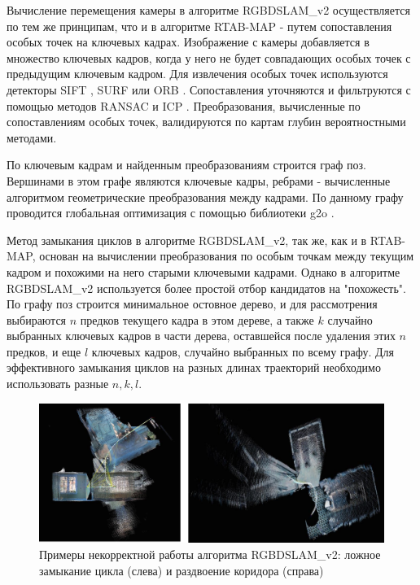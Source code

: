 \documentclass{mipt-thesis-ms}
\begin{document}
	Вычисление перемещения камеры в алгоритме RGBDSLAM\_v2 осуществляется по тем же принципам, что и в алгоритме RTAB-MAP - путем сопоставления особых точек на ключевых кадрах. Изображение с камеры добавляется в множество ключевых кадров, когда у него не будет совпадающих особых точек с предыдущим ключевым кадром. Для извлечения особых точек используются детекторы SIFT \cite{lowe2004distinctive}, SURF \cite{bay2008speeded} или ORB \cite{rublee2011orb}. Сопоставления уточняются и фильтруются с помощью методов RANSAC \cite{brachmann2017dsac} и ICP \cite{chetverikov2005robust}. Преобразования, вычисленные по сопоставлениям особых точек, валидируются по картам глубин вероятностными методами.
	
	По ключевым кадрам и найденным преобразованиям строится граф поз. Вершинами в этом графе являются ключевые кадры, ребрами - вычисленные алгоритмом геометрические преобразования между кадрами. По данному графу проводится глобальная оптимизация с помощью библиотеки g2o \cite{grisetti2011g2o}.
	
	Метод замыкания циклов в алгоритме RGBDSLAM\_v2, так же, как и в RTAB-MAP, основан на вычислении преобразования по особым точкам между текущим кадром и похожими на него старыми ключевыми кадрами. Однако в алгоритме RGBDSLAM\_v2 используется более простой отбор кандидатов на "похожесть". По графу поз строится минимальное остовное дерево, и для рассмотрения выбираются $n$ предков текущего кадра в этом дереве, а также $k$ случайно выбранных ключевых кадров в части дерева, оставшейся после удаления этих $n$ предков, и еще $l$ ключевых кадров, случайно выбранных по всему графу. Для эффективного замыкания циклов на разных длинах траекторий необходимо использовать разные $n, k, l$.
	
	\begin{figure}
		\includegraphics[width=1.0\textwidth]{img/rgbdslam_fails.png}
		\caption{Примеры некорректной работы алгоритма RGBDSLAM\_v2: ложное замыкание цикла (слева) и раздвоение коридора (справа)}
		\label{figure_rgbdslam_fails}
	\end{figure}
	
\end{document}
